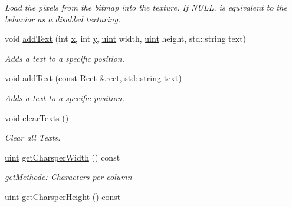 \begin{DoxyCompactItemize}
\begin{DoxyCompactList}\small\item\em Load the pixels from the bitmap into the texture. If NULL, is equivalent to the behavior as a disabled texturing. \item\end{DoxyCompactList}\item 
void \hyperlink{class_f2_c_1_1_font_sprite_ae1be1c6e70f794e6b8bf56b60528119e}{addText} (int \hyperlink{class_f2_c_1_1_sprite_base_a552f88034a04e6ac41f22519ac53076c}{x}, int \hyperlink{class_f2_c_1_1_sprite_base_a33a3d48628d9a3130c603eaf902f209f}{y}, \hyperlink{namespace_f2_c_a58be2bac9eb3e3c99cb41b6008bf4fae}{uint} width, \hyperlink{namespace_f2_c_a58be2bac9eb3e3c99cb41b6008bf4fae}{uint} height, std::string text)
\begin{DoxyCompactList}\small\item\em Adds a text to a specific position. \item\end{DoxyCompactList}\item 
void \hyperlink{class_f2_c_1_1_font_sprite_a86138fa37543cdf1c28735b175f55fb8}{addText} (const \hyperlink{class_f2_c_1_1_rect}{Rect} \&rect, std::string text)
\begin{DoxyCompactList}\small\item\em Adds a text to a specific position. \item\end{DoxyCompactList}\item 
\hypertarget{class_f2_c_1_1_font_sprite_ab293fd22588a8dbe63fb264ea8085e09}{
void \hyperlink{class_f2_c_1_1_font_sprite_ab293fd22588a8dbe63fb264ea8085e09}{clearTexts} ()}
\label{class_f2_c_1_1_font_sprite_ab293fd22588a8dbe63fb264ea8085e09}

\begin{DoxyCompactList}\small\item\em Clear all Texts. \item\end{DoxyCompactList}\item 
\hypertarget{class_f2_c_1_1_font_sprite_a81bce69eb04c048d007d98262e916824}{
\hyperlink{namespace_f2_c_a58be2bac9eb3e3c99cb41b6008bf4fae}{uint} \hyperlink{class_f2_c_1_1_font_sprite_a81bce69eb04c048d007d98262e916824}{getCharsperWidth} () const }
\label{class_f2_c_1_1_font_sprite_a81bce69eb04c048d007d98262e916824}

\begin{DoxyCompactList}\small\item\em getMethode: Characters per column \item\end{DoxyCompactList}\item 
\hypertarget{class_f2_c_1_1_font_sprite_abd03d3df667c51e99608a7e3cb7ba775}{
\hyperlink{namespace_f2_c_a58be2bac9eb3e3c99cb41b6008bf4fae}{uint} \hyperlink{class_f2_c_1_1_font_sprite_abd03d3df667c51e99608a7e3cb7ba775}{getCharsperHeight} () const }
\label{class_f2_c_1_1_font_sprite_abd03d3df667c51e99608a7e3cb7ba775}


\end{DoxyCompactItemize}
